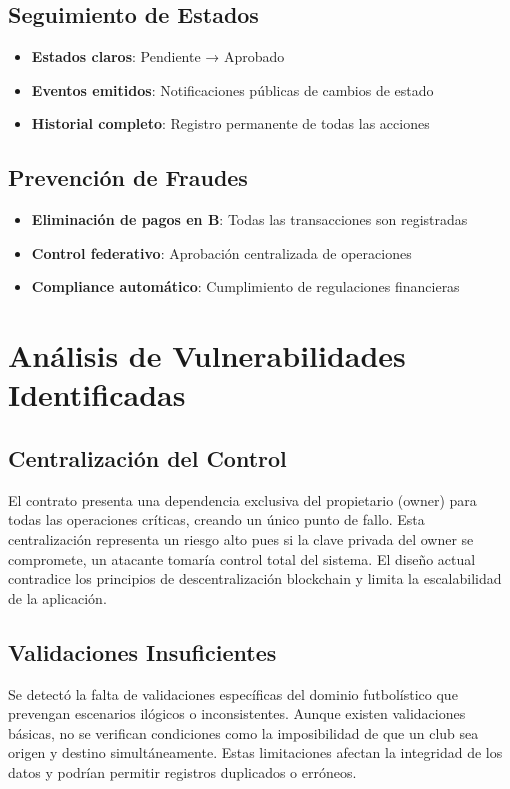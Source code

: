 \documentclass[12pt,a4paper]{article}
\begin{document}
	\subsection{Seguimiento de Estados}
	\begin{itemize}
		\item \textbf{Estados claros}: Pendiente → Aprobado
		\item \textbf{Eventos emitidos}: Notificaciones públicas de cambios de estado
		\item \textbf{Historial completo}: Registro permanente de todas las acciones
	\end{itemize}
	
	\subsection{Prevención de Fraudes}
	\begin{itemize}
		\item \textbf{Eliminación de pagos en B}: Todas las transacciones son registradas
		\item \textbf{Control federativo}: Aprobación centralizada de operaciones
		\item \textbf{Compliance automático}: Cumplimiento de regulaciones financieras
	\end{itemize}
	
\section{Análisis de Vulnerabilidades Identificadas}

\subsection{Centralización del Control}
El contrato presenta una dependencia exclusiva del propietario (owner) para todas las operaciones críticas, creando un único punto de fallo. Esta centralización representa un riesgo alto pues si la clave privada del owner se compromete, un atacante tomaría control total del sistema. El diseño actual contradice los principios de descentralización blockchain y limita la escalabilidad de la aplicación.

\subsection{Validaciones Insuficientes}
Se detectó la falta de validaciones específicas del dominio futbolístico que prevengan escenarios ilógicos o inconsistentes. Aunque existen validaciones básicas, no se verifican condiciones como la imposibilidad de que un club sea origen y destino simultáneamente. Estas limitaciones afectan la integridad de los datos y podrían permitir registros duplicados o erróneos.
\end{document}
